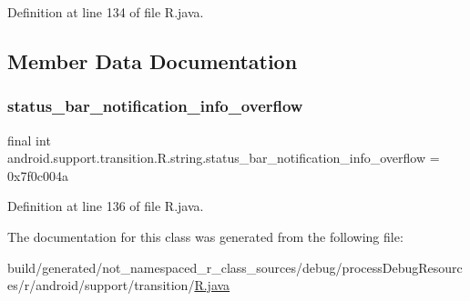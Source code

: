 Definition at line 134 of file R.\+java.


\begin{DoxyCode}{0}

\end{DoxyCode}


\subsection{Member Data Documentation}
\mbox{\label{classandroid_1_1support_1_1transition_1_1_r_1_1string_af545e59339bc447d1f12b77542fae31f}} 
\subsubsection{\texorpdfstring{status\_bar\_notification\_info\_overflow}{status\_bar\_notification\_info\_overflow}}
{\footnotesize\ttfamily final int android.\+support.\+transition.\+R.\+string.\+status\+\_\+bar\+\_\+notification\+\_\+info\+\_\+overflow = 0x7f0c004a\hspace{0.3cm}{\ttfamily [static]}}



Definition at line 136 of file R.\+java.



The documentation for this class was generated from the following file\+:\begin{DoxyCompactItemize}
\item 
build/generated/not\+\_\+namespaced\+\_\+r\+\_\+class\+\_\+sources/debug/process\+Debug\+Resources/r/android/support/transition/\mbox{\hyperlink{android_2support_2transition_2_r_8java}{R.\+java}}\end{DoxyCompactItemize}

